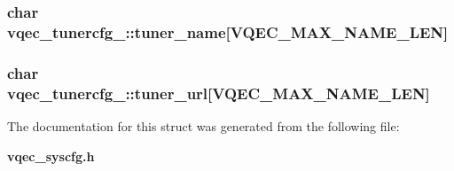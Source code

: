 \subsubsection{\setlength{\rightskip}{0pt plus 5cm}char \bf{vqec\_\-tunercfg\_\-::tuner\_\-name}[VQEC\_\-MAX\_\-NAME\_\-LEN]}\label{structvqec__tunercfg___c33b90b5228b22b3a0e8251e9b61d248}


\subsubsection{\setlength{\rightskip}{0pt plus 5cm}char \bf{vqec\_\-tunercfg\_\-::tuner\_\-url}[VQEC\_\-MAX\_\-NAME\_\-LEN]}\label{structvqec__tunercfg___481198251abc2828f2218f77830e430c}




The documentation for this struct was generated from the following file:\begin{CompactItemize}
\item 
\bf{vqec\_\-syscfg.h}\end{CompactItemize}
